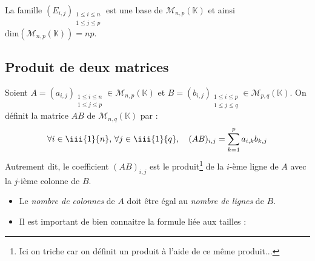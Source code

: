 \documentclass[french,11pt,twoside]{VcCours}
\begin{document}
\begin{Proposition}{} La famille $(E_{i,j})_{\substack{1 \leq i \leq n \\ 1 \leq j \leq p}}$ est une base de $\mathcal{M}_{n,p}(\mathbb{K})$ et ainsi $\textrm{dim}(\mathcal{M}_{n,p}(\mathbb{K}))=np$.
\end{Proposition}


\subsection{Produit de deux matrices}

Soient $A=(a_{i,j})_{\substack{1 \leq i \leq n \\ 1 \leq j \leq p}} \in \mathcal{M}_{n,p}(\mathbb{K})$ et $B=(b_{i,j})_{\substack{1 \leq i \leq p \\ 1 \leq j \leq q}} \in \mathcal{M}_{p,q}(\mathbb{K})$. On définit la matrice $AB$ de $\mathcal{M}_{n,q}(\mathbb{K})$ par :
$$ \forall i \in \iii{1}{n}, \, \forall j \in \iii{1}{q}, \quad (AB)_{i,j} = \sum_{k=1}^p a_{i,k} b_{k,j}$$
Autrement dit, le coefficient $(AB)_{i,j}$ est le produit\footnote{Ici on triche car on définit un produit à l'aide de ce même produit... } de la $i$-ème ligne de $A$ avec la $j$-ième colonne de $B$.

\medskip

\begin{Remarques}{}
\begin{itemize}
 \item Le \emph{nombre de colonnes} de $A$ doit être égal au \emph{nombre de lignes} de $B$.
\item Il est important de bien connaitre la formule liée aux tailles : 


\begin{center}
\end{center}
\end{itemize}
\end{Remarques}{}
\end{document}
